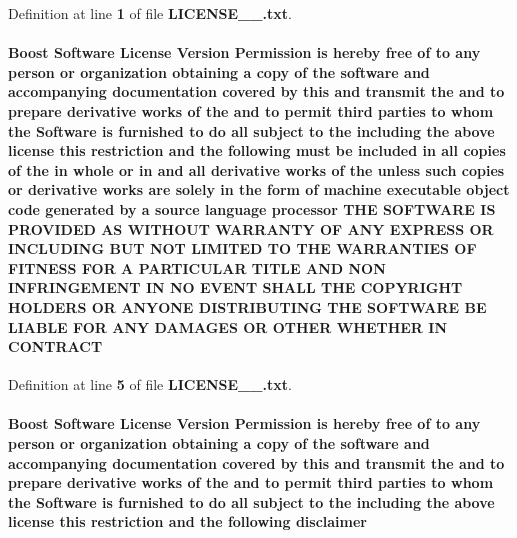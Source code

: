 Definition at line {\bf 1} of file {\bf L\+I\+C\+E\+N\+S\+E\+\_\+\_.\+txt}.

\paragraph[{C\+O\+N\+T\+R\+A\+CT}]{\setlength{\rightskip}{0pt plus 5cm}Boost {\bf Software} License Version Permission is hereby free of to any person or organization obtaining a copy of the software and accompanying documentation covered by this and transmit the and to prepare derivative works of the and to permit third parties to whom the {\bf Software} is furnished to do {\bf all} subject to the including the above {\bf license} this restriction and the {\bf following} must be included in {\bf all} copies of the in whole or in and {\bf all} derivative works of the unless such copies or derivative works are solely in the form of machine executable object code generated by a source language processor T\+HE S\+O\+F\+T\+W\+A\+RE {\bf IS} P\+R\+O\+V\+I\+D\+ED AS W\+I\+T\+H\+O\+UT W\+A\+R\+R\+A\+N\+TY OF A\+NY E\+X\+P\+R\+E\+SS OR I\+N\+C\+L\+U\+D\+I\+NG B\+UT N\+OT L\+I\+M\+I\+T\+ED TO T\+HE W\+A\+R\+R\+A\+N\+T\+I\+ES OF F\+I\+T\+N\+E\+SS F\+OR A P\+A\+R\+T\+I\+C\+U\+L\+AR T\+I\+T\+LE A\+ND N\+ON I\+N\+F\+R\+I\+N\+G\+E\+M\+E\+NT IN NO E\+V\+E\+NT S\+H\+A\+LL T\+HE C\+O\+P\+Y\+R\+I\+G\+HT H\+O\+L\+D\+E\+RS OR A\+N\+Y\+O\+NE D\+I\+S\+T\+R\+I\+B\+U\+T\+I\+NG T\+HE S\+O\+F\+T\+W\+A\+RE BE L\+I\+A\+B\+LE F\+OR A\+NY D\+A\+M\+A\+G\+ES OR O\+T\+H\+ER W\+H\+E\+T\+H\+ER IN C\+O\+N\+T\+R\+A\+CT}\label{LICENSE__1__0_8txt_a8381101c32c24245df320934259c9a7e}


Definition at line {\bf 5} of file {\bf L\+I\+C\+E\+N\+S\+E\+\_\+\_.\+txt}.

\paragraph[{disclaimer}]{\setlength{\rightskip}{0pt plus 5cm}Boost {\bf Software} License Version Permission is hereby free of to any person or organization obtaining a copy of the software and accompanying documentation covered by this and transmit the and to prepare derivative works of the and to permit third parties to whom the {\bf Software} is furnished to do {\bf all} subject to the including the above {\bf license} this restriction and the {\bf following} disclaimer}\label{LICENSE__1__0_8txt_ad95efb310f68b3c958498573a9a9ddda}


